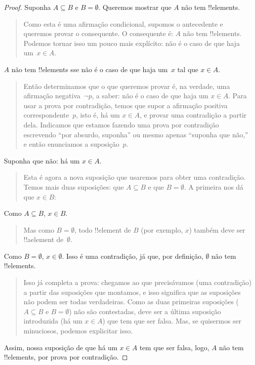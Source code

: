 \documentclass[../../../include/open-logic-section]{subfiles}
\begin{document}
\begin{proof}
  Suponha $A \subseteq B$ e $B = \emptyset$. Queremos mostrar que
  $A$ não tem !!{element}s.
  \begin{quote}
    Como esta é uma afirmação condicional, supomos o antecedente e
    queremos provar o consequente. O consequente é: $A$ não tem
    !!{element}s. Podemos tornar isso um pouco mais explícito: não é o
    caso de que haja um~$x \in A$.
  \end{quote}
  $A$ não tem !!{element}s sse não é o caso de que haja um~$x$
  tal que $x \in A$.
  \begin{quote}
    Então determinamos que o que queremos provar é, na verdade, uma
    afirmação negativa~$\lnot p$, a saber: não é o caso de que haja
    um $x \in A$.  Para usar a prova por contradição, temos que supor a
    afirmação positiva correspondente~$p$, isto é, há um $x \in A$, e
    provar uma contradição a partir dela.  Indicamos que estamos fazendo uma
    prova por contradição escrevendo ``por
    absurdo, suponha'' ou mesmo apenas ``suponha que não,'' e então enunciamos
    a suposição~$p$.
  \end{quote}
  Suponha que não: há um $x \in A$.
  \begin{quote}
    Esta é agora a nova suposição que usaremos para obter uma
    contradição. Temos mais duas suposições: que $A \subseteq B$
    e que $B = \emptyset$. A primeira nos dá que $x \in B$:
  \end{quote}
  Como $A \subseteq B$, $x \in B$.
  \begin{quote}
    Mas como $B = \emptyset$, todo !!{element} de $B$ (por exemplo, $x$)
    também deve ser !!a{element} de~$\emptyset$.
  \end{quote}
  Como $B = \emptyset$, $x \in \emptyset$. Isso é uma contradição,
  já que, por definição, $\emptyset$ não tem !!{element}s.
  \begin{quote}
    Isso já completa a prova: chegamos ao que precisávamos (uma
    contradição) a partir das suposições que montamos, e isso significa
    que as suposições não podem ser todas verdadeiras. Como as duas primeiras
    suposições ($A \subseteq B$ e $B = \emptyset$) não são
    contestadas, deve ser a última suposição introduzida (há um
    $x \in A$) que tem que ser falsa. Mas, se quisermos ser minuciosos,
    podemos explicitar isso.
  \end{quote}
  Assim, nossa suposição de que há um $x \in A$ tem que ser falsa, logo,
  $A$ não tem !!{element}s, por prova por contradição.
\end{proof}
\end{document}

